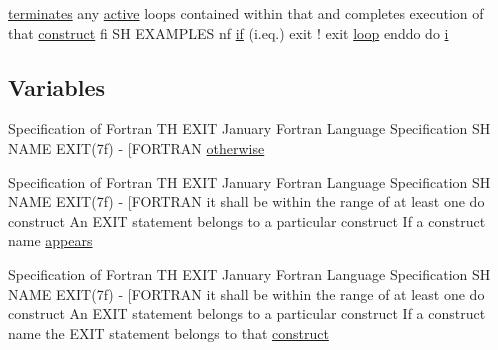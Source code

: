 \begin{DoxyCompactItemize}
\hyperlink{do_87_8txt_aaa6a96bc95c5da31cfe2ec4f94db576c}{terminates} any \hyperlink{do_87_8txt_a3300b8e9ebbb88612226328b1b2fd93f}{active} loops contained within that and completes execution of that \hyperlink{exit_87_8txt_aa7ebb4c04e8aa413d646a62e1f67fb5c}{construct} fi SH E\+X\+A\+M\+P\+L\+ES nf \hyperlink{exit_87_8txt_a77395982f8d25581c808c40f3b634d90}{if} (i.\+eq.) exit ! exit \hyperlink{continue_87_8txt_a5094e6a64d1227c84a0bf4db8f6c3788}{loop} enddo do \hyperlink{intro__blas1_83_8txt_a8ba82a50c0c2c12d5f6a77f7e4651c0b}{i}
\end{DoxyCompactItemize}
\subsection*{Variables}
\begin{DoxyCompactItemize}
\item 
Specification of Fortran TH E\+X\+IT January Fortran Language Specification SH N\+A\+ME E\+X\+IT(7f) -\/ \mbox{[}\+F\+O\+R\+T\+R\+AN \hyperlink{exit_87_8txt_add9358f1f2e831e2906102c98d66905f}{otherwise}
\item 
Specification of Fortran TH E\+X\+IT January Fortran Language Specification SH N\+A\+ME E\+X\+IT(7f) -\/ \mbox{[}\+F\+O\+R\+T\+R\+A\+N it shall be within the range of at least one do construct An E\+X\+I\+T statement belongs to a particular construct If a construct name \hyperlink{exit_87_8txt_a66fa619682984d2d9673755b5015add3}{appears}
\item 
Specification of Fortran TH E\+X\+IT January Fortran Language Specification SH N\+A\+ME E\+X\+IT(7f) -\/ \mbox{[}\+F\+O\+R\+T\+R\+A\+N it shall be within the range of at least one do construct An E\+X\+I\+T statement belongs to a particular construct If a construct name the E\+X\+I\+T statement belongs to that \hyperlink{exit_87_8txt_aa7ebb4c04e8aa413d646a62e1f67fb5c}{construct}
\item 

\end{DoxyCompactItemize}
